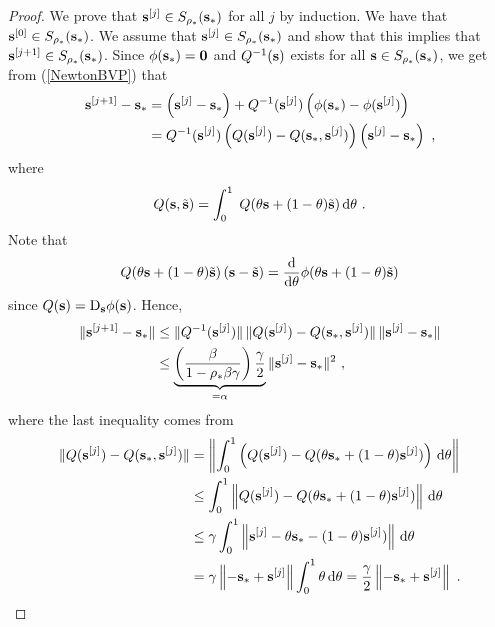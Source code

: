 \begin{proof}
We prove that $\mathbf{s}^{[j]} \in S_{\rho_\ast}(\mathbf{s}_\ast)$ for all $j$
by induction.  We have that $\mathbf{s}^{[0]} \in S_{\rho_\ast}(\mathbf{s}_\ast)$.
We assume that $\mathbf{s}^{[j]} \in S_{\rho_\ast}(\mathbf{s}_\ast)$ and show
that this implies that $\mathbf{s}^{[j+1]} \in S_{\rho_\ast}(\mathbf{s}_\ast)$.
Since $\phi(\mathbf{s}_\ast) = \mathbf{0}$ and $Q^{-1}(\mathbf{s})$
exists for all $\mathbf{s} \in S_{\rho_\ast}(\mathbf{s}_\ast)$, we get
from (\ref{NewtonBVP}) that
\begin{align*}
\mathbf{s}^{[j+1]} - \mathbf{s}_\ast &= \left( \mathbf{s}^{[j]} - \mathbf{s}_\ast \right)
+ Q^{-1}(\mathbf{s}^{[j]}) \left( \phi(\mathbf{s}_\ast) -
\phi(\mathbf{s}^{[j]})\right) \\
&= Q^{-1}(\mathbf{s}^{[j]}) \left( Q(\mathbf{s}^{[j]}) -
Q(\mathbf{s}_\ast, \mathbf{s}^{[j]}) \right) \left( \mathbf{s}^{[j]}
- \mathbf{s}_\ast \right)  \ ,
\end{align*}
where
\[
Q(\mathbf{s},\tilde{\mathbf{s}}) = \int_0^1 \;
Q(\theta \mathbf{s} + (1-\theta) \tilde{\mathbf{s}}) \,\mathrm{d}\theta \ .
\]
Note that
\[
Q(\theta \mathbf{s} + (1-\theta)\tilde{\mathbf{s}})
\left(\mathbf{s} - \tilde{\mathbf{s}} \right) =
\frac{\mathrm{d}}{\mathrm{d}{\theta}}{\phi(\theta \mathbf{s} + (1-\theta)\tilde{\mathbf{s}})}
\]
since $\displaystyle Q(\mathbf{s}) = \mathrm{D}_{\mathbf{s}}\phi(\mathbf{s})$.
Hence,
\begin{align}
\| \mathbf{s}^{[j+1]} - \mathbf{s}_\ast \|
& \leq \| Q^{-1}(\mathbf{s}^{[j]}) \|\,
\| Q(\mathbf{s}^{[j]}) - Q(\mathbf{s}_\ast,\mathbf{s}^{[j]}) \| \,
\| \mathbf{s}^{[j]} - \mathbf{s}_\ast \| \nonumber \\
&\leq
\underbrace{\left(\frac{\beta}{1-\rho_\ast \beta\gamma}\right)
\frac{\gamma}{2}}_{=\alpha}
\| \mathbf{s}^{[j]} - \mathbf{s}_\ast \|^2 \ , \label{Pcontract}
\end{align}
where the last inequality comes from
\begin{align}
\| Q(\mathbf{s}^{[j]}) - Q(\mathbf{s}_\ast,\mathbf{s}^{[j]}) \|
&= \left\| \int_0^1 \left( Q(\mathbf{s}^{[j]}) - 
Q(\theta \mathbf{s}_\ast + (1-\theta)\mathbf{s}^{[j]}) \right) \,\mathrm{d}\theta \right\|
\nonumber \\
& \leq \int_0^1 \left\| Q(\mathbf{s}^{[j]}) - 
Q(\theta \mathbf{s}_\ast + (1-\theta)\mathbf{s}^{[j]}) \right\| \,\mathrm{d}\theta
\nonumber \\
& \leq \gamma \int_0^1 \left\| \mathbf{s}^{[j]} - 
\theta \mathbf{s}_\ast - (1-\theta)\mathbf{s}^{[j]}) \right\| \,\mathrm{d}\theta
\nonumber \\
& = \gamma  \left\|-\mathbf{s}_\ast +\mathbf{s}^{[j]} \right\|
\int_0^1 \theta  \,\mathrm{d}\theta
= \frac{\gamma}{2}  \left\|-\mathbf{s}_\ast +\mathbf{s}^{[j]} \right\| \ .
\label{CforNewtonInt}
\end{align}


\end{proof}
